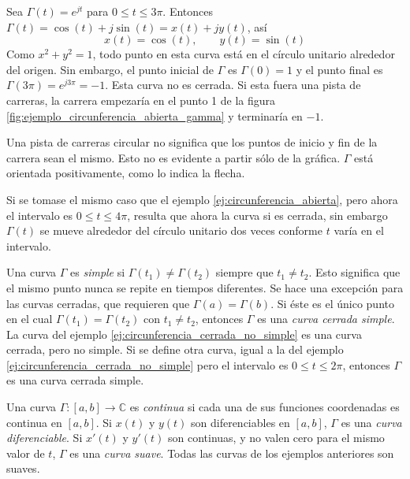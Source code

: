 \begin{example}
  Sea $\Gamma(t)=e^{jt}$ para $0\leqslant t \leqslant 3\pi$. Entonces $\Gamma(t)=\cos(t)+j\sin(t)=x(t)+jy(t)$, así
  \begin{equation*}
    x(t)=\cos(t),\qquad y(t)=\sin(t)
  \end{equation*}
  Como $x^2+y^2=1$, todo punto en esta curva está en el círculo unitario alrededor del origen. Sin embargo, el punto inicial de $\Gamma$ es $\Gamma(0)=1$ y el punto final es $\Gamma(3\pi)=e^{j3\pi}=-1$. Esta curva no es cerrada. Si esta fuera una pista de carreras, la carrera empezaría en el punto 1 de la figura \ref{fig:ejemplo_circunferencia_abierta_gamma} y terminaría en $-1$. 
  
  Una pista de carreras circular no significa que los puntos de inicio y fin de la carrera sean el mismo. Esto no es evidente a partir sólo de la gráfica. $\Gamma$ está orientada positivamente, como lo indica la flecha.
  \label{ej:circunferencia_abierta}
\end{example}
\begin{example}
  Si se tomase el mismo caso que el ejemplo \ref{ej:circunferencia_abierta}, pero ahora el intervalo es $0\leqslant t \leqslant 4\pi$, resulta que ahora la curva si es cerrada, sin embargo $\Gamma(t)$ se mueve alrededor del círculo unitario dos veces conforme $t$ varía en el intervalo.
  \label{ej:circunferencia_cerrada_no_simple}
\end{example}

Una curva $\Gamma$ es \textit{simple} si $\Gamma(t_1)\neq \Gamma(t_2)$ siempre que $t_1\neq t_2$. Esto significa que el mismo punto nunca se repite en tiempos diferentes. Se hace una excepción para las curvas cerradas, que requieren que $\Gamma(a)=\Gamma(b)$. Si éste es el único punto en el cual $\Gamma(t_1)=\Gamma(t_2)$ con $t_1\neq t_2$, entonces $\Gamma$ es una \textit{curva cerrada simple}. La curva del ejemplo \ref{ej:circunferencia_cerrada_no_simple} es una curva cerrada, pero no simple. Si se define otra curva, igual a la del ejemplo \ref{ej:circunferencia_cerrada_no_simple} pero el intervalo es $0\leqslant t \leqslant 2\pi$, entonces $\Gamma$ es una curva cerrada simple.

Una curva $\Gamma:[a,b]\to \mathbb{C}$ es \textit{continua} si cada una de sus funciones coordenadas es continua en $[a,b]$. Si $x(t)$ y $y(t)$ son diferenciables en $[a,b]$, $\Gamma$ es una \textit{curva diferenciable}. Si $x'(t)$ y $y'(t)$ son continuas, y no valen cero para el mismo valor de $t$, $\Gamma$ es una \textit{curva suave}. Todas las curvas de los ejemplos anteriores son suaves.

